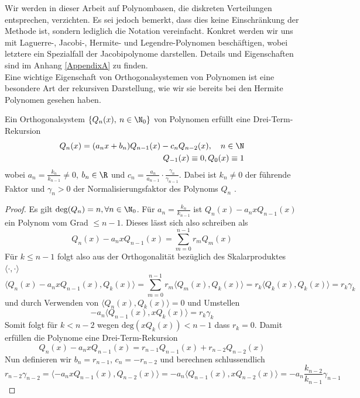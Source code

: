 Wir werden in dieser Arbeit auf Polynombasen, die diskreten Verteilungen entsprechen, verzichten. Es sei jedoch bemerkt, dass dies keine Einschränkung der Methode ist, sondern lediglich die Notation vereinfacht. Konkret werden wir uns mit Laguerre-, Jacobi-, Hermite- und Legendre-Polynomen beschäftigen, wobei letztere ein Spezialfall der Jacobipolynome darstellen. Details und Eigenschaften sind im Anhang \ref{AppendixA} zu finden.\\[0.3cm]
Eine wichtige Eigenschaft von Orthogonalsystemen von Polynomen ist eine besondere Art der rekursiven Darstellung, wie wir sie bereits bei den Hermite Polynomen gesehen haben.
\begin{maththeorem}
\label{threetermexist}
Ein Orthogonalsystem $\left\lbrace Q_n(x),\: n\in\N_0\right\rbrace$ von Polynomen erfüllt eine Drei-Term-Rekursion
\begin{eqnarray}
Q_n(x)=(a_nx+b_n)Q_{n-1}(x)-c_nQ_{n-2}(x),\quad n\in\N\\
Q_{-1}(x)\equiv 0, Q_0(x)\equiv 1\nonumber
\end{eqnarray}
wobei $a_n=\frac{k_n}{k_{n-1}}\neq 0$, $b_n\in\R$ und $c_n=\frac{a_n}{a_{n-1}}\cdot \frac{\gamma_n}{\gamma_{n-1}}$.
Dabei ist $k_n\neq 0$ der führende Faktor und $\gamma_n>0$ der Normalisierungsfaktor des Polynoms $Q_n$ . 
\end{maththeorem}
\begin{proof}
Es gilt $\text{deg}(Q_n)=n,\forall n\in\N_0$. Für $a_n=\frac{k_n}{k_{n-1}}$ ist $Q_n(x)-a_nxQ_{n-1}(x)$ ein Polynom vom Grad $\le n-1$. Dieses lässt sich also schreiben als
\[Q_n(x)-a_nxQ_{n-1}(x)=\sum_{m=0}^{n-1}r_mQ_m(x)\]
Für $k\le n-1$ folgt also aus der Orthogonalität bezüglich des Skalarproduktes $\langle\cdot,\cdot\rangle$
\begin{equation*}
\langle Q_n(x)-a_nxQ_{n-1}(x),Q_k(x)\rangle=\sum_{m=0}^{n-1}r_m\langle Q_m(x),Q_k(x)\rangle=r_k\langle Q_k(x),Q_k(x)\rangle=r_k\gamma_k
\end{equation*}
und durch Verwenden von $\langle Q_n(x),Q_k(x)\rangle = 0$ und Umstellen
\[ -a_n\langle Q_{n-1}(x),xQ_k(x)\rangle=r_k\gamma_k\]
Somit folgt für $k<n-2$ wegen $\text{deg}(xQ_k(x))<n-1$ dass $r_k=0$. Damit erfüllen die Polynome eine Drei-Term-Rekursion
\[Q_n(x)-a_nxQ_{n-1}(x)=r_{n-1}Q_{n-1}(x)+r_{n-2}Q_{n-2}(x)\]
Nun definieren wir $b_n=r_{n-1}$, $c_n=-r_{n-2}$ und berechnen schlussendlich
\[r_{n-2}\gamma_{n-2}=\langle -a_nxQ_{n-1}(x),Q_{n-2}(x)\rangle =-a_n\langle Q_{n-1}(x),xQ_{n-2}(x)\rangle=-a_n\frac{k_{n-2}}{k_{n-1}}\gamma_{n-1}\]
\end{proof}
